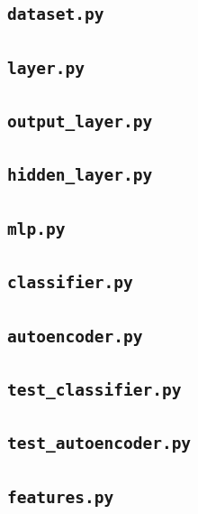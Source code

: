 \documentclass[a4paper, 12pt, titlepage]{article}
\begin{document}
  \subsection{\texttt{dataset.py}}
  
  \subsection{\texttt{layer.py}}
  
  \subsection{\texttt{output\_layer.py}}
  
  \subsection{\texttt{hidden\_layer.py}}
  
  \subsection{\texttt{mlp.py}}
  
  \subsection{\texttt{classifier.py}}
  
  \subsection{\texttt{autoencoder.py}}
  
  \subsection{\texttt{test\_classifier.py}}
  
  \subsection{\texttt{test\_autoencoder.py}}
  
  \subsection{\texttt{features.py}}
  
\end{document}
